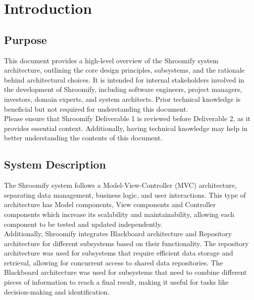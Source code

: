 \documentclass[]{article}
\begin{document}
\newpage
\section{Introduction}
\label{sec:introduction}


\subsection{Purpose}
\label{sub:purpose}
This document provides a high-level overview of the Shroomify system architecture, outlining the core design principles, subsystems, and the rationale behind architectural choices. It is intended for internal stakeholders involved in the development of Shroomify, including software engineers, project managers, investors, domain experts, and system architects. Prior technical knowledge is beneficial but not required for understanding this document. \\
Please ensure that Shroomify Deliverable 1 is reviewed before Deliverable 2, as it provides essential context. Additionally, having technical knowledge may help in better understanding the contents of this document.

\subsection{System Description}
\label{sub:system_description}
The Shroomify system follows a Model-View-Controller (MVC) architecture, separating data management, business logic, and user interactions. This type of architecture has Model components, View components and Controller components which increase its scalability and  maintainability, allowing each component to be tested and updated independently.\\

\noindent Additionally, Shroomify integrates Blackboard architecture and Repository architecture for  different subsystems based on their functionality. The repository architecture was used for subsystems that require efficient data storage and retrieval, allowing for concurrent access to shared data repositories. The Blackboard architecture was used for subsystems that need to combine different pieces of information to reach a final result, making it useful for tasks like decision-making and identification.
\end{document}
